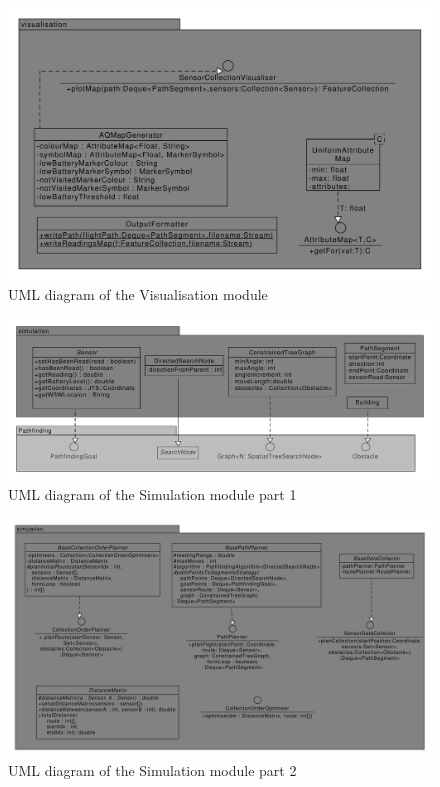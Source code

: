 \documentclass[10pt,a4paper]{article}
\begin{document}
\begin{figure}[H]
    \centering
    \includegraphics[width=0.9\columnwidth]{diagrams/visualisation.uxf.pdf}
    \caption{UML diagram of the Visualisation module}
    \label{fig:visualisation}
\end{figure}

\begin{figure}[H]
    \centering
    \includegraphics[width=1\columnwidth]{diagrams/simulation.uxf.pdf}
    \caption{UML diagram of the Simulation module part 1}
    \label{fig:simulation}
\end{figure}

\begin{figure}[H]
    \centering
    \includegraphics[width=1\columnwidth]{diagrams/simulation2.uxf.pdf}
    \caption{UML diagram of the Simulation module part 2}
    \label{fig:simulation2}
\end{figure}
\end{document}
